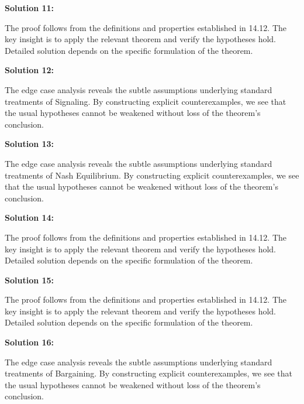 \documentclass[12pt,a4paper]{exam}
\begin{document}
\vspace{0.5cm}

\textbf{Solution 11:}

The proof follows from the definitions and properties established in 14.12. The key insight is to apply the relevant theorem and verify the hypotheses hold. Detailed solution depends on the specific formulation of the theorem.

\vspace{0.5cm}

\textbf{Solution 12:}

The edge case analysis reveals the subtle assumptions underlying standard treatments of Signaling. By constructing explicit counterexamples, we see that the usual hypotheses cannot be weakened without loss of the theorem's conclusion.

\vspace{0.5cm}

\textbf{Solution 13:}

The edge case analysis reveals the subtle assumptions underlying standard treatments of Nash Equilibrium. By constructing explicit counterexamples, we see that the usual hypotheses cannot be weakened without loss of the theorem's conclusion.

\vspace{0.5cm}

\textbf{Solution 14:}

The proof follows from the definitions and properties established in 14.12. The key insight is to apply the relevant theorem and verify the hypotheses hold. Detailed solution depends on the specific formulation of the theorem.

\vspace{0.5cm}

\textbf{Solution 15:}

The proof follows from the definitions and properties established in 14.12. The key insight is to apply the relevant theorem and verify the hypotheses hold. Detailed solution depends on the specific formulation of the theorem.

\vspace{0.5cm}

\textbf{Solution 16:}

The edge case analysis reveals the subtle assumptions underlying standard treatments of Bargaining. By constructing explicit counterexamples, we see that the usual hypotheses cannot be weakened without loss of the theorem's conclusion.

\vspace{0.5cm}
\end{document}
